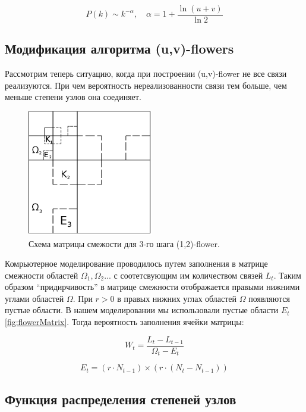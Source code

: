 \documentclass[10pt,aps,pra]{revtex4-1}
\begin{document}
\begin{equation}
P(k) \sim k^{-\alpha}, \quad \alpha = 1+\frac{\ln{(u+v)}}{\ln{2}}
\end{equation}

\subsection{Модификация алгоритма (u,v)-flowers}

Рассмотрим теперь ситуацию, когда при построении (u,v)-flower не все связи реализуются. При чем вероятность нереализованности связи тем больше, чем меньше степени узлов она соединяет.

\begin{figure}[H]

\centering
\includegraphics[height=5.5cm]{graphics/third_n.png}
\caption{
\label{fig:flowerMatrixExceptive}
Схема матрицы смежости для 3-го шага (1,2)-flower.}
\end{figure}

Комрьютерное моделирование проводилось путем заполнения в матрице смежности областей $\Omega_1, \Omega_2...$ с соотетсвующим им количеством связей $L_t$. Таким образом ``придирчивость'' в матрице смежности отображается правыми нижними углами областей $\Omega$. При $r>0$ в правых нижних углах областей $\Omega$ появляются пустые области. В нашем моделировании мы использовали пустые области $E_t$ \ref{fig:flowerMatrix}. Тогда вероятность заполнения ячейки матрицы:

\begin{equation}
W_t=\frac{L_t-L_{t-1}}{\Omega_t-E_t}
\end{equation}

\begin{equation}
E_t= (r \cdot N_{t-1}) \times (r \cdot (N_t - N_{t-1}))
\end{equation}

\subsection{Функция распределения степеней узлов}
\end{document}
